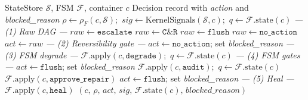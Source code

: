 \documentclass[conference]{IEEEtran}
\begin{document}
\begin{algorithm}
\caption{Type~F FSM-Gated Reconciliation (single container $c$)}
\label{alg:reconcile}
\small
\begin{algorithmic}[1]
\REQUIRE StateStore $\mathcal{S}$, FSM $\mathcal{F}$, container $c$
\ENSURE Decision record with \textit{action} and \textit{blocked\_reason}
\STATE $\rho \leftarrow \rho_F(c, \mathcal{S})$;\ $\mathit{sig} \leftarrow \mathrm{KernelSignals}(\mathcal{S}, c)$;\ $q \leftarrow \mathcal{F}.\mathrm{state}(c)$
\STATE \textit{--- (1) Raw DAG ---}
    \STATE $\mathit{raw} \leftarrow \texttt{escalate}$
    \STATE $\mathit{raw} \leftarrow \texttt{C\&R}$
    \STATE $\mathit{raw} \leftarrow \texttt{flush}$
\ELSE
    \STATE $\mathit{raw} \leftarrow \texttt{no\_action}$
\ENDIF
\STATE $\mathit{act} \leftarrow \mathit{raw}$
\STATE \textit{--- (2) Reversibility gate ---} 
    \STATE $\mathit{act} \leftarrow \texttt{no\_action}$; set \textit{blocked\_reason}
\ENDIF
\STATE \textit{--- (3) FSM degrade ---}
    \STATE $\mathcal{F}.\mathrm{apply}(c, \texttt{degrade})$;\ $q \leftarrow \mathcal{F}.\mathrm{state}(c)$
\ENDIF
\STATE \textit{--- (4) FSM gates ---}
    \STATE $\mathit{act} \leftarrow \texttt{flush}$; set \textit{blocked\_reason} 
\ENDIF
{}
    \STATE $\mathcal{F}.\mathrm{apply}(c, \texttt{audit})$;\ $q \leftarrow \mathcal{F}.\mathrm{state}(c)$ 
\ENDIF
{}
    \STATE $\mathcal{F}.\mathrm{apply}(c, \texttt{approve\_repair})$ 
\ENDIF
{}
    \STATE $\mathit{act} \leftarrow \texttt{flush}$; set \textit{blocked\_reason} 
\ENDIF
\STATE \textit{--- (5) Heal ---}
    \STATE $\mathcal{F}.\mathrm{apply}(c, \texttt{heal})$ 
\ENDIF
\RETURN $(c,\, \rho,\, \mathit{act},\, \mathit{sig},\, \mathcal{F}.\mathrm{state}(c),\, \mathit{blocked\_reason})$
\end{algorithmic}
\end{algorithm}
\end{document}
